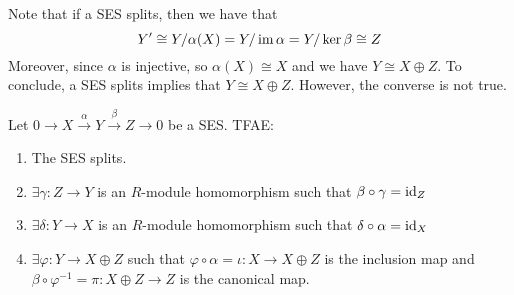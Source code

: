 \medskip

\begin{re}
    Note that if a SES splits, then we have that
    \[Y'\cong Y/\alpha(X)= Y/\operatorname{im} \alpha = Y/\ker\beta \cong Z\]
    Moreover, since $\alpha$ is injective, so $\alpha(X)\cong X$ and  we have $Y\cong X\oplus Z$. To conclude, a SES splits implies that $Y\cong X\oplus Z$. However, the converse is not true.
\end{re}

\medskip

\begin{pro} \label{pro: SES splits}
    Let $0\to X\xrightarrow{\alpha}Y\xrightarrow{\beta}Z\to 0$ be a SES. TFAE:
    \begin{enumerate}
        \item The SES splits.
        \item $\exists \gamma:Z\to Y$ is an $R$-module homomorphism such that $\beta\circ \gamma = \operatorname{id}_Z$
        \item $\exists \delta: Y\to X$ is an $R$-module homomorphism such that $\delta\circ \alpha = \operatorname{id}_X$
        \item $\exists \varphi:Y\to X\oplus Z$ such that $\varphi\circ \alpha = \iota:X\to X\oplus Z$ is the inclusion map and $\beta\circ \varphi^{-1}=\pi:X\oplus Z\to Z$ is the canonical map.
    \end{enumerate}
\end{pro}
